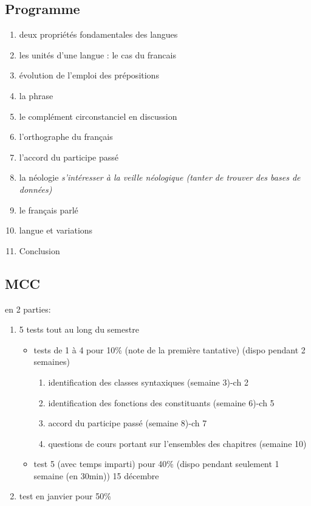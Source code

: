 \subsection{Programme}
\begin{enumerate}
   \item deux propriétés fondamentales des langues
   \item les unités d'une langue : le cas du francais
   \item évolution de l'emploi des prépositions
   \item la phrase
   \item le complément circonstanciel en discussion
   \item l'orthographe du français
   \item l'accord du participe passé 
   \item la néologie \textit{s'intéresser à la veille néologique (tanter de trouver des bases de données)}
   \item le français parlé
   \item langue et variations
   \item Conclusion
\end{enumerate}

\subsection{MCC}
en 2 parties:
\begin{enumerate}
   \item 5 tests tout au long du semestre
      \begin{itemize} 
         \item tests de 1 à 4 pour 10\% (note de la première tantative) (dispo pendant 2 semaines)
            \begin{enumerate} 
               \item identification des classes syntaxiques (semaine 3)-ch 2
               \item identification des fonctions des constituants (semaine 6)-ch 5
               \item accord du participe passé (semaine 8)-ch 7
               \item questions de cours portant sur l'ensembles des chapitres (semaine 10)
            \end{enumerate}
         \item test 5 (avec temps imparti) pour 40\% (dispo pendant seulement 1 semaine (en 30min)) 15 décembre
      \end{itemize}
   \item test en janvier pour 50\%
\end{enumerate}

